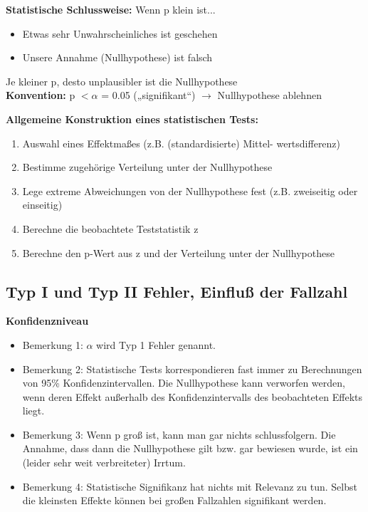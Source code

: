 \textbf{Statistische Schlussweise:} Wenn p klein ist...
\begin{itemize}
	\item Etwas sehr Unwahrscheinliches ist geschehen
	\item Unsere Annahme (Nullhypothese) ist falsch
\end{itemize}

Je kleiner p, desto unplausibler ist die Nullhypothese\\
\textbf{Konvention:} p $< \alpha$ = 0.05 („signifikant“) $\rightarrow$ Nullhypothese ablehnen

\newpage
\textbf{Allgemeine Konstruktion eines statistischen Tests:}
\begin{enumerate}
	\item Auswahl eines Effektmaßes (z.B. (standardisierte) Mittel-
wertsdifferenz)
	\item Bestimme zugehörige Verteilung unter der Nullhypothese
	\item Lege extreme Abweichungen von der Nullhypothese fest (z.B. zweiseitig oder einseitig)
	\item Berechne die beobachtete Teststatistik z
	\item Berechne den p-Wert aus z und der Verteilung unter der Nullhypothese
\end{enumerate}

\subsection{Typ I und Typ II Fehler, Einfluß der Fallzahl}
\textbf{Konfidenzniveau}
\begin{itemize}
	\item Bemerkung 1: $\alpha$ wird Typ 1 Fehler genannt.
	\item Bemerkung 2: Statistische Tests korrespondieren fast immer zu Berechnungen von 95\% Konfidenzintervallen. Die Nullhypothese kann verworfen werden, wenn deren Effekt außerhalb des Konfidenzintervalls des beobachteten Effekts liegt.
	\item Bemerkung 3: Wenn p groß ist, kann man gar nichts schlussfolgern. Die Annahme, dass dann die Nullhypothese gilt bzw. gar bewiesen wurde, ist ein (leider sehr weit verbreiteter) Irrtum.
	\item Bemerkung 4: Statistische Signifikanz hat nichts mit Relevanz zu tun. Selbst die kleinsten Effekte können bei großen Fallzahlen signifikant werden.
\end{itemize}

